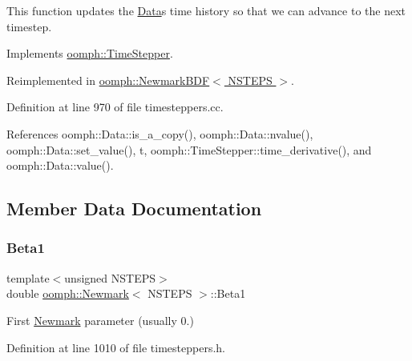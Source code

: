 This function updates the \hyperlink{classoomph_1_1Data}{Data}\textquotesingle{}s time history so that we can advance to the next timestep. 



Implements \hyperlink{classoomph_1_1TimeStepper_a010a3b03a23a1c48dd8ca10641427255}{oomph\+::\+Time\+Stepper}.



Reimplemented in \hyperlink{classoomph_1_1NewmarkBDF_a4726c0ea901167bc2124c63bf6e5f692}{oomph\+::\+Newmark\+B\+D\+F$<$ N\+S\+T\+E\+P\+S $>$}.



Definition at line 970 of file timesteppers.\+cc.



References oomph\+::\+Data\+::is\+\_\+a\+\_\+copy(), oomph\+::\+Data\+::nvalue(), oomph\+::\+Data\+::set\+\_\+value(), t, oomph\+::\+Time\+Stepper\+::time\+\_\+derivative(), and oomph\+::\+Data\+::value().



\subsection{Member Data Documentation}
\mbox{\label{classoomph_1_1Newmark_a916754e6f33077cf6c0e4f4b2f3cff09}} 
\subsubsection{\texorpdfstring{Beta1}{Beta1}}
{\footnotesize\ttfamily template$<$unsigned N\+S\+T\+E\+PS$>$ \\
double \hyperlink{classoomph_1_1Newmark}{oomph\+::\+Newmark}$<$ N\+S\+T\+E\+PS $>$\+::Beta1\hspace{0.3cm}{\ttfamily [protected]}}



First \hyperlink{classoomph_1_1Newmark}{Newmark} parameter (usually 0.) 



Definition at line 1010 of file timesteppers.\+h.

\mbox{\label{classoomph_1_1Newmark_a01274acab6f486732be1cc37fb5b40ce}} 
